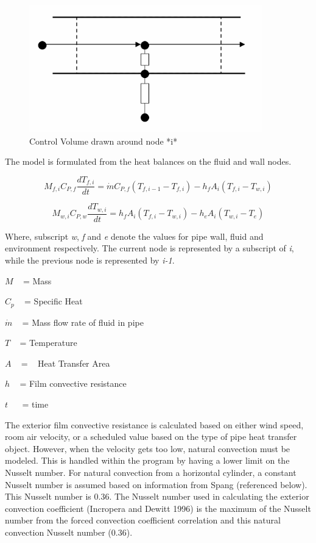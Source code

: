 \begin{figure}[hbtp] %
\centering
\includegraphics[width=0.9\textwidth, height=0.9\textheight, keepaspectratio=true]{media/image5831.png}
\caption{Control Volume drawn around node *i* \protect \label{fig:control-volume-drawn-around-node-i}}
\end{figure}

The model is formulated from the heat balances on the fluid and wall nodes.

\begin{equation}
{M_{f,i}}{C_{P,f}}\frac{{d{T_{f,i}}}}{{dt}} = \dot m{C_{P,f}}\left( {{T_{f,i - 1}} - {T_{f,i}}} \right) - {h_f}{A_i}\left( {{T_{f,i}} - {T_{w,i}}} \right)
\end{equation}

\begin{equation}
{M_{w,i}}{C_{P,w}}\frac{{d{T_{w,i}}}}{{dt}} = {h_f}{A_i}\left( {{T_{f,i}} - {T_{w,i}}} \right) - {h_e}{A_i}\left( {{T_{w,i}} - {T_e}} \right)
\end{equation}

Where, subscript \emph{w}, \emph{f} and \emph{e} denote the values for pipe wall, fluid and environment respectively. The current node is represented by a subscript of \emph{i}, while the previous node is represented by \emph{i-1}.

\(M\) ~ = Mass

\({C_p}\) ~ = Specific Heat

\(\dot m\) ~ = Mass flow rate of fluid in pipe

\(T\) ~ = Temperature

\(A\) ~ = ~ Heat Transfer Area

\(h\) ~ = Film convective resistance

\(t\) ~~ = time

The exterior film convective resistance is calculated based on either wind speed, room air velocity, or a scheduled value based on the type of pipe heat transfer object. However, when the velocity gets too low, natural convection must be modeled. This is handled within the program by having a lower limit on the Nusselt number. For natural convection from a horizontal cylinder, a constant Nusselt number is assumed based on information from Spang (referenced below). This Nusselt number is 0.36. The Nusselt number used in calculating the exterior convection coefficient (Incropera and Dewitt 1996) is the maximum of the Nusselt number from the forced convection coefficient correlation and this natural convection Nusselt number (0.36).

